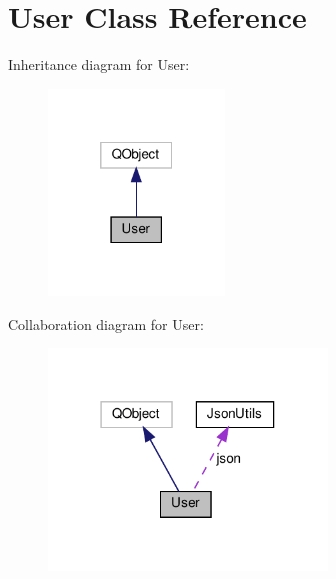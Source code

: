 \hypertarget{classUser}{}\section{User Class Reference}
\label{classUser}


Inheritance diagram for User\+:
\nopagebreak
\begin{figure}[H]
\begin{center}
\leavevmode
\includegraphics[width=133pt]{classUser__inherit__graph}
\end{center}
\end{figure}


Collaboration diagram for User\+:
\nopagebreak
\begin{figure}[H]
\begin{center}
\leavevmode
\includegraphics[width=210pt]{classUser__coll__graph}
\end{center}
\end{figure}
